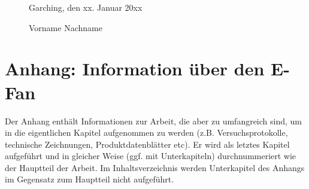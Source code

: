 \documentclass[utf8, a4paper, 11pt, parskip, pointlessnumbers]{scrreprt}
\begin{document}
\begin{figure}[h]
\begin{minipage}[t]{0.45\textwidth}
\vspace{0.1\textheight}
  Garching, den xx. Januar 20xx
\end{minipage}
\begin{minipage}[t]{0.45\textwidth}
\begin{flushright}
  \vspace{0.13\textheight}
  \hrulefill
  \begin{center}
  Vorname Nachname
  \end{center}
\end{flushright}
\end{minipage}
\end{figure}

\renewcommand{\thechapter}{\Alph} %
\appendix

\chapter{Anhang: Information über den E-Fan}

\setcounter{page}{1}
\renewcommand{\thepage}{\thechapter-\arabic{page}} %
\renewcommand\thefigure{\Alph{chapter}.\arabic{figure}} 
 \setcounter{figure}{0} 
\renewcommand\thetable{\Alph{chapter}.\arabic{table}} 
 \setcounter{table}{0} 

Der Anhang enthält Informationen zur Arbeit, die aber zu umfangreich sind, um in die eigentlichen Kapitel aufgenommen zu werden (z.B. Versuchsprotokolle, technische Zeichnungen, Produktdatenblätter etc). Er wird als letztes Kapitel aufgeführt und in gleicher Weise (ggf. mit Unterkapiteln) durchnummeriert wie der Hauptteil der Arbeit. Im Inhaltsverzeichnis werden Unterkapitel des Anhangs im Gegensatz zum Hauptteil nicht aufgeführt.

\stoptocwriting %
\end{document}
